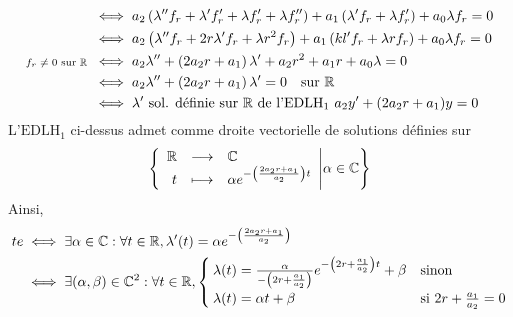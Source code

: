 \documentclass{article}
\begin{document}
\begin{question_kholle}
\begin{align}
		                                        & \iff a_{2} \left(\lambda'' f_{r} + \lambda' f_{r}' + \lambda f_{r}' + \lambda f_{r}''\right) + a_{1} \left(\lambda' f_{r} + \lambda f_{r}'\right) + a_{0} \lambda f_{r} = 0                              \nonumber \\
		                                        & \iff a_{2} \left(\lambda'' f_{r} + 2r \lambda' f_{r} + \lambda r^{2} f_{r}\right) + a_{1} \left(kl' f_{r} + \lambda r f_{r}\right)+ a_{0} \lambda f_{r} = 0                                     \nonumber          \\
		\text{\scriptsize $f_{r}\neq 0$ sur \ensuremath{\mathbb R} } & \iff a_{2} \lambda'' + \left(2a_{2}r + a_{1}\right)\lambda' + a_{2}r^{2} + a_{1}r + a_{0}\lambda = 0                                                                                  \nonumber                    \\
		                                        & \iff a_{2} \lambda'' + \left(2a_{2}r +a_{1}\right)\lambda' = 0 \quad\text{sur } \mathbb R                                                                                          \nonumber                              \\
		                                        & \iff \lambda' \text{ sol. définie sur \ensuremath{\mathbb R} de l'$\mathrm{EDLH_{1}}$ } a_{2}y' + (2a_{2}r + a_{1})y=0 \label{s7:q2:1}
	\end{align}
	L'$\mathrm{EDLH_{1}}$ ci-dessus admet comme droite vectorielle de solutions définies sur \R
	\[
		\left\{\begin{array}{rcl} \mathbb R & \longrightarrow & \mathbb C \\ t & \longmapsto & \alpha e^{-\left(\frac{2a_{2}r+a_{1}}{a_{2}}\right)t} \end{array} \middle | \alpha\in\mathbb C\right\}
	\]
	Ainsi,
	\begin{align*}
		te & \iff \exists \alpha\in\C: \forall t\in\R, \lambda'(t)=\alpha e^{-\left(\frac{2a_{2}r + a_{1}}{a_{2}}\right)}                                                                                                                                                 \\
		   & \iff \exists (\alpha, \beta)\in\C^{2}: \forall t\in\R, \begin{cases}
			                                                            \lambda(t)=\frac{\alpha}{-\left(2r+\frac{a_{1}}{a_{2}}\right)}e^{-\left(2r+\frac{a_{1}}{a_{2}}\right)t}+\beta & \text{sinon}                        \\
			                                                            \lambda(t)=\alpha t+\beta                                                                                     & \text{si } 2r+\frac{a_{1}}{a_{2}}=0
		                                                            \end{cases} \\

\end{align*}
\end{question_kholle}
\end{document}
